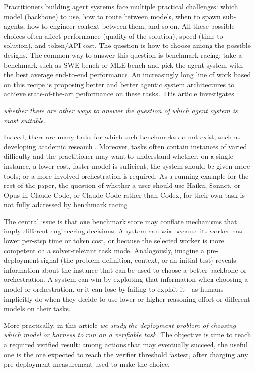 \documentclass{article}
\begin{document}
Practitioners building agent systems face multiple practical challenges:
which model (backbone) to use, how to route between models, when to spawn sub-agents, how to engineer context between them, and so on.
All these possible choices often affect performance (quality of the solution), speed (time to solution), and token/API cost.
The question is how to choose among the possible designs.
The common way to answer this question is benchmark racing:
take a benchmark such as SWE-bench \citep{jimenez2024swebench} or MLE-bench \citep{chan2024mlebench} and pick the agent system with the best average end-to-end performance.
An increasingly long line of work based on this recipe is proposing better and better agentic system architectures to achieve state-of-the-art performance on these tasks.
This article investigates
\begin{center}
    \textit{
    whether there are other ways to answer the question of which agent system is most suitable.}
\end{center}
Indeed, there are many tasks for which such benchmarks do not exist, such as developing academic research \citep{PoggioAIMSc_2026}. Moreover, tasks often contain instances of varied difficulty and the practitioner may want to understand whether, on a single instance, a lower-cost, faster model is sufficient; the system should be given more tools; or a more involved orchestration is required.
As a running example for the rest of the paper, the question of whether a user should use Haiku, Sonnet, or Opus in Claude Code, or Claude Code rather than Codex, for their own task is not fully addressed by benchmark racing.

The central issue is that one benchmark score may conflate mechanisms that imply different engineering decisions.
A system can win because its worker has lower per-step time or token cost, or because the selected worker is more competent on a solver-relevant task mode.
Analogously, imagine a pre-deployment signal (the problem definition, context, or an initial test) reveals information about the instance that can be used to choose a better backbone or orchestration.
A system can win by exploiting that information when choosing a model or orchestration, or it can lose by failing to exploit it---as humans implicitly do when they decide to use lower or higher reasoning effort or different models on their tasks.

More practically, in this article
\textit{we study the deployment problem of choosing which model or harness to run on a verifiable task.}
The objective is time to reach a required verified result: among actions that may eventually succeed, the useful one is the one expected to reach the verifier threshold fastest, after charging any pre-deployment measurement used to make the choice.
\end{document}
